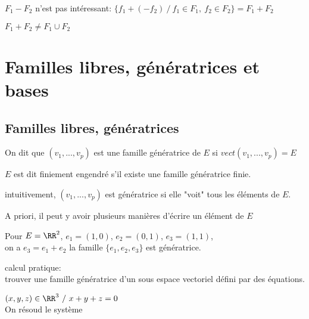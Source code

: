 \documentclass[../main.tex]{subfile}
\begin{document}
\begin{rema}
	$F_1 - F_2$ n'est pas intéressant: $\{f_1 + (-f_2)\ / \ f_1 \in F_1, \ f_2 \in F_2\} = F_1 + F_2$ 
\end{rema}

\begin{rema}
	$F_1 + F_2 \neq F_1 \cup F_2$
\end{rema}

\section{Familles libres, génératrices et bases}
\subsection{Familles libres, génératrices}

\begin{defi}
	On dit que $(v_1, ..., v_p)$ est une famille génératrice de $E$ si $vect(v_1, ..., v_p) = E$
\end{defi}

\begin{vocab}
	$E$ est dit finiement engendré s'il existe une famille génératrice finie.
\end{vocab}

\begin{rema}
	intuitivement, $(v_1, ..., v_p)$ est génératrice si elle "voit" tous les éléments de $E$.
\end{rema}

\begin{rema}
	A priori, il peut y avoir plusieurs manières d'écrire un élément de $E$
\end{rema}

\begin{ex}
	Pour $E = \RR^2$, $e_1 = (1, 0)$, $e_2=(0, 1)$, $e_3 = (1, 1)$, \\
	on a $e_3 = e_1 + e_2$
	la famille $\{e_1, e_2, e_3\}$ est génératrice.
\end{ex}

calcul pratique:\\
trouver une famille génératrice d'un sous espace vectoriel défini par des équations.\\
\begin{ex}
	$(x, y, z) \in \RR^3 \ / \ x + y + z = 0$\\
	On résoud le système %
\end{ex}
\end{document}
